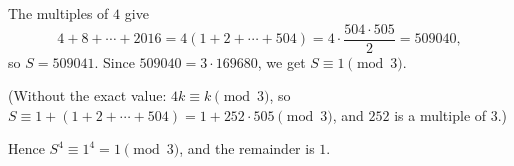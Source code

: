The multiples of $4$ give
\[
4+8+\cdots+2016=4(1+2+\cdots+504)=4\cdot\dfrac{504\cdot505}{2}=509040,
\]
so $S=509041$. Since $509040=3\cdot169680$, we get $S\equiv1\pmod3$.

(Without the exact value: $4k\equiv k\pmod3$, so $S\equiv1+(1+2+\cdots+504)=1+252\cdot505\pmod 3$, and $252$ is a multiple of $3$.)

Hence $S^4\equiv1^4=1\pmod3$, and the remainder is $\boxed{1}$.
